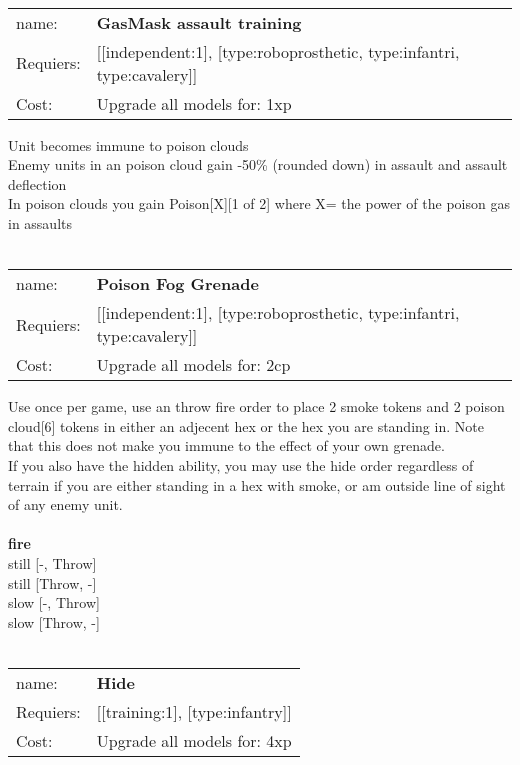 \ \\
\begin{tabular}{ll}
name: & {\bf GasMask assault training } \\
Requiers: & [[independent:1], [type:roboprosthetic, type:infantri, type:cavalery]] \\
Cost: & Upgrade all models for: 1xp \\
\end{tabular}

Unit becomes immune to poison clouds\\ 
Enemy units in an poison cloud gain -50\% (rounded down) in assault and assault deflection\\ 
In poison clouds you gain Poison[X][1 of 2] where X= the power of the poison gas in assaults\\ 









\ \\
\begin{tabular}{ll}
name: & {\bf Poison Fog Grenade } \\
Requiers: & [[independent:1], [type:roboprosthetic, type:infantri, type:cavalery]] \\
Cost: & Upgrade all models for: 2cp \\
\end{tabular}

Use once per game, use an throw fire order to place 2 smoke tokens and 2 poison cloud[6] tokens in either an adjecent hex or the hex you are standing in. Note that this does not make you immune to the effect of your own grenade.\\ 
If you also have the hidden ability, you may use the hide order regardless of terrain if you are either standing in a hex with smoke, or am outside line of sight of any enemy unit. \\ 








\ \\ {\bf fire } \\
still [-, Throw] \\
still [Throw, -] \\
slow [-, Throw] \\
slow [Throw, -] \\

\ \\
\begin{tabular}{ll}
name: & {\bf Hide } \\
Requiers: & [[training:1], [type:infantry]] \\
Cost: & Upgrade all models for: 4xp \\
\end{tabular}

